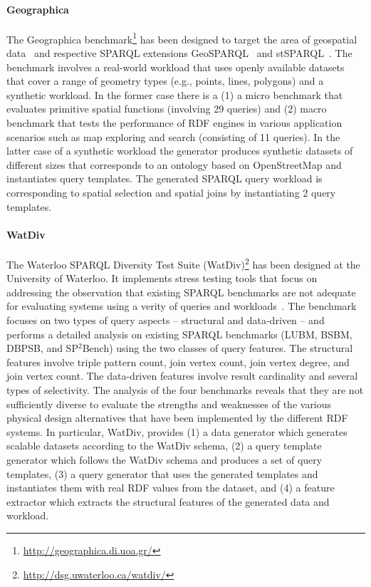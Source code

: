 \paragraph{Geographica} The Geographica benchmark\footnote{\url{http://geographica.di.uoa.gr/}} has been designed to target the area of geospatial data~\cite{DBLP:conf/semweb/GarbisKK13} and respective SPARQL extensions GeoSPARQL~\cite{battle2012enabling} and stSPARQL~\cite{koubarakis2010modeling}. The benchmark involves a real-world workload that uses openly available datasets that cover a range of geometry types (e.g., points, lines, polygons) and  a synthetic workload. In the former case there is a (1) a micro benchmark that evaluates primitive spatial functions (involving 29 queries) and (2) macro benchmark that tests the performance of RDF engines in various application scenarios such as  map exploring and search (consisting of 11 queries). In the latter case of a synthetic workload the generator produces synthetic datasets of different sizes that corresponds to an ontology based on OpenStreetMap  and instantiates query templates. \iffalse The spatial extent of the land ownership dataset constitutes a uniform grid of $n \times n$ hexagons, whereas the size of each dataset is given relatively to $n$.\fi The generated SPARQL query workload is corresponding to spatial selection and spatial joins by instantiating 2 query templates.


\paragraph{WatDiv} The Waterloo SPARQL Diversity Test Suite (WatDiv)\footnote{\url{http://dsg.uwaterloo.ca/watdiv/}} has been designed at the University of Waterloo. It implements stress testing tools that focus on addressing the observation that existing SPARQL benchmarks are not adequate for evaluating systems using a verity of queries and  workloads~\cite{Aluc:2014:DST:2717213.2717229}. The benchmark focuses on two types of query aspects -- structural and data-driven -- and performs a detailed analysis on existing SPARQL benchmarks (LUBM, BSBM, DBPSB, and SP$^2$Bench) using the two classes of query features. The structural features involve triple pattern count, join vertex count, join vertex degree, and join vertex count. The data-driven features involve result cardinality and several types of selectivity. The analysis of the four benchmarks reveals that they are not sufficiently diverse to evaluate the strengths and weaknesses of the various physical design alternatives that have been implemented by the different RDF systems. In particular, WatDiv, provides (1) a data generator which generates scalable datasets according to the WatDiv schema, (2) a query template generator which follows the WatDiv schema and produces a  set of query templates, (3) a query generator that uses the generated templates and instantiates them  with real RDF values from the dataset, and (4) a feature extractor which extracts the structural features of the generated data and workload. %

